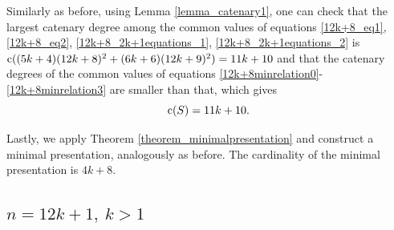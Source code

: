 \documentclass[12pt]{article}
\theoremstyle{remark}
\begin{document}
Similarly as before, using Lemma \ref{lemma_catenary1}, one can check that the largest catenary degree among the common values of equations \eqref{12k+8_eq1}, \eqref{12k+8_eq2}, \eqref{12k+8_2k+1equations_1}, \eqref{12k+8_2k+1equations_2} is $\textup{c}((5k+4)(12k+8)^2 + (6k+6)(12k+9)^2 ) = 11k+10$ and that the catenary degrees of the common values of equations \eqref{12k+8minrelation0}-\eqref{12k+8minrelation3} are smaller than that, which gives
$$ \textup{c}(S) = 11k+10.$$

Lastly, we apply Theorem \ref{theorem_minimalpresentation} and construct a minimal presentation, analogously as before. The cardinality of the minimal presentation is $4k+8$.

\subsection{$n = 12k + 1, \ k>1$}
\end{document}
